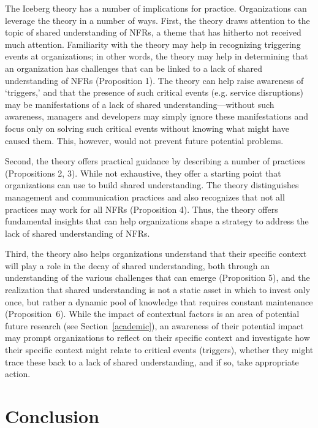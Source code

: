 \documentclass[smallextended]{svjour3}
\begin{document}
The Iceberg theory has a number of implications for practice. 
Organizations can leverage the theory in a number of ways. 
First, the theory draws attention to the topic of shared understanding of NFRs, a theme that has hitherto not received much attention. Familiarity with the theory may help in recognizing triggering events at organizations; in other words, the theory may help in determining that an organization has challenges that can be linked to a lack of shared understanding of NFRs (Proposition 1). 
The theory can help raise awareness of `triggers,' and that the presence of such critical events (e.g. service disruptions) may be manifestations of a lack of shared understanding---without such awareness, managers and developers may simply ignore these manifestations and focus only on solving such critical events without knowing what might have caused them. This, however, would not prevent future potential problems.

Second, the theory offers practical guidance by describing a number of practices (Propositions 2, 3). While not exhaustive, they offer a starting point that organizations can use to build shared understanding. The theory distinguishes management and communication practices and also recognizes that not all practices may work for all NFRs (Proposition 4). Thus, the theory offers fundamental insights that can help organizations shape a strategy to address the lack of shared understanding of NFRs. 

Third, the theory also helps organizations understand that their specific context will play a role in the decay of shared understanding, both through an understanding of the various challenges that can emerge (Proposition 5), and the realization that shared understanding is not a static asset in which to invest only once, but rather a dynamic pool of knowledge that requires constant maintenance (Proposition~6). 
While the impact of contextual factors is an area of potential future research (see Section~\ref{academic}), an awareness of their potential impact may prompt organizations to reflect on their specific context and investigate how their specific context might relate to critical events (triggers), whether they might trace these back to a lack of shared understanding, and if so, take appropriate action.








\section{Conclusion}
\label{sec:conclusion}
\end{document}
